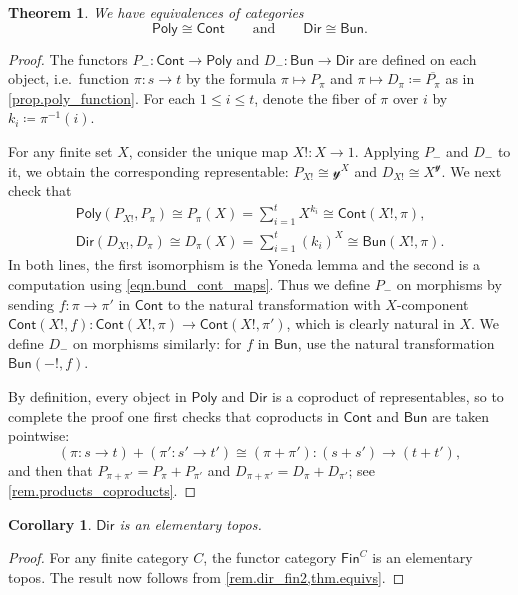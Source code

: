 \documentclass[11pt, article, one side]{memoir}
\theoremstyle{theorem}
\newtheorem{theorem}[equation]{Theorem}
\newtheorem{corollary}[equation]{Corollary}
\theoremstyle{definition}
\theoremstyle{remark}
\newcommand{\Cat}[1]{\mathsf{#1}}%
\newcommand{\inv}{^{-1}}
\newcommand{\finset}{\Cat{Fin}}
\newcommand{\cont}{\Cat{Cont}}
\newcommand{\bun}{\Cat{Bun}}
\newcommand{\yon}{\mathcal{y}}
\newcommand{\poly}{\Cat{Poly}}
\newcommand{\dir}{\Cat{Dir}}
\newcommand{\qqand}{\qquad\text{and}\qquad}
\begin{document}
\begin{theorem}\label{thm.equivs}
We have equivalences of categories
\[
\poly\cong\cont
\qqand
\dir\cong\bun.
\]
\end{theorem}
\begin{proof}
The functors $P_-\colon\cont\to\poly$ and $D_-\colon\bun\to\dir$ are defined on each object, i.e.\ function $\pi\colon s\to t$ by the formula $\pi\mapsto P_\pi$ and $\pi\mapsto D_\pi\coloneqq\overline{P_\pi}$ as in \cref{prop.poly_function}. For each $1\leq i\leq t$, denote the fiber of $\pi$ over $i$ by $k_i\coloneqq\pi\inv(i)$.

For any finite set $X$, consider the unique map $X!\colon X\to 1$. Applying $P_-$ and $D_-$ to it, we obtain the corresponding representable: $P_{X!}\cong\yon^X$ and $D_{X!}\cong X^\yon$. We next check that
 \begin{gather*}
  \poly(P_{X!},P_\pi)\cong 
  P_\pi(X)=
  \sum_{i=1}^{t}X^{k_i}\cong
  \cont(X!, \pi),
  \\
  \dir(D_{X!}, D_\pi)\cong 
  D_\pi(X)=
  \sum_{i=1}^{t}(k_i)^X\cong
  \bun(X!, \pi).
\end{gather*}
In both lines, the first isomorphism is the Yoneda lemma and the second is a computation using \cref{eqn.bund_cont_maps}. Thus we define $P_-$ on morphisms by sending $f\colon\pi\to\pi'$ in $\cont$ to the natural transformation with $X$-component $\cont(X!,f)\colon\cont(X!,\pi)\to\cont(X!,\pi')$, which is clearly natural in $X$. We define $D_-$ on morphisms similarly: for $f$ in $\bun$, use the natural transformation $\bun(-!,f)$.

By definition, every object in $\poly$ and $\dir$ is a coproduct of representables, so to complete the proof one first checks that coproducts in $\cont$ and $\bun$ are taken pointwise:
\[
(\pi\colon s\to t)+(\pi'\colon s'\to t')\cong(\pi+\pi')\colon (s+s')\to (t+t'),
\]
and then that $P_{\pi+\pi'}=P_\pi+P_{\pi'}$ and $D_{\pi+\pi'}=D_\pi+D_{\pi'}$; see \cref{rem.products_coproducts}.
\end{proof}

\begin{corollary}
$\dir$ is an elementary topos.
\end{corollary}
\begin{proof}
For any finite category $C$, the functor category $\finset^C$ is an elementary topos. The result now follows from \cref{rem.dir_fin2,thm.equivs}.
\end{proof}
\end{document}
